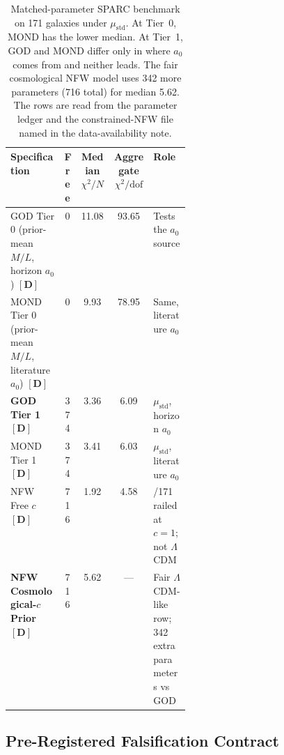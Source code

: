 \documentclass[aps,prd,preprint,superscriptaddress,nofootinbib,amsmath,amssymb,floatfix]{revtex4-2}
\makeatletter
\DeclareRobustCommand{\_}{%
    \ifmmode\nfss@text{\textunderscore}\else\textunderscore\penalty\z@\fi}%
\makeatother
\begin{document}
\begin{table}[t]
\centering
\footnotesize
\setlength{\tabcolsep}{4pt}
\begin{tabularx}{\linewidth}{@{}>{\raggedright\arraybackslash}p{0.30\linewidth} c c c >{\raggedright\arraybackslash}X@{}}
\toprule
\textbf{Specification} & \textbf{Free} & \textbf{Median $\chi^2/N$} & \textbf{Aggregate $\chi^2/\mathrm{dof}$} & \textbf{Role} \\
\midrule
GOD Tier 0 (prior-mean $M/L$, horizon $a_0$) $\mathbf{[D]}$ & 0 & 11.08 & 93.65 & Tests the $a_0$ source \\
MOND Tier 0 (prior-mean $M/L$, literature $a_0$) $\mathbf{[D]}$ & 0 & 9.93 & 78.95 & Same, literature $a_0$ \\
\textbf{GOD Tier 1} $\mathbf{[D]}$ & 374 & 3.36 & 6.09 & $\mu_{\text{std}}$, horizon $a_0$ \\
MOND Tier 1 $\mathbf{[D]}$ & 374 & 3.41 & 6.03 & $\mu_{\text{std}}$, literature $a_0$ \\
NFW Free $c$ $\mathbf{[D]}$ & 716 & 1.92 & 4.58 & 97/171 railed at $c=1$; not $\Lambda$CDM \\
\textbf{NFW Cosmological-$c$ Prior} $\mathbf{[D]}$ & 716 & 5.62 & --- & Fair $\Lambda$CDM-like row; 342 extra parameters vs GOD \\
\bottomrule
\end{tabularx}
\caption{Matched-parameter SPARC benchmark on 171 galaxies under $\mu_{\text{std}}$. At Tier~0, MOND has the lower median. At Tier~1, GOD and MOND differ only in where $a_0$ comes from and neither leads. The fair cosmological NFW model uses 342 more parameters (716 total) for median 5.62. The rows are read from the parameter ledger and the constrained-NFW file named in the data-availability note.}
\label{tab:sparc_results}
\end{table}

\subsection{Pre-Registered Falsification Contract}
\end{document}
